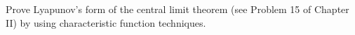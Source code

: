 Prove Lyapunov's form of the central limit theorem (see Problem 15 of Chapter II) by using characteristic function techniques.
